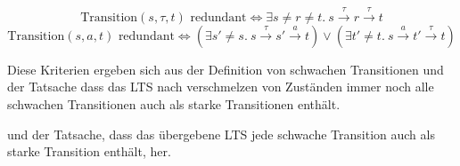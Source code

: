 \documentclass[a4paper]{scrartcl}
\begin{document}
\begin{equation*}
\text{Transition}(s, \tau, t) \text{ redundant} \Leftrightarrow \exists s \neq r \neq t.\: s \overset{\tau}{\rightarrow} r \overset{\tau}{\rightarrow} t
\end{equation*}
\begin{equation*}
\text{Transition}(s, a, t) \text{ redundant} \Leftrightarrow
(\exists s' \neq s.\: s \overset{\tau}{\rightarrow} s' \overset{a}{\rightarrow} t)
\vee (\exists t' \neq t.\: s \overset{a}{\rightarrow} t' \overset{\tau}{\rightarrow} t)
\end{equation*}

Diese Kriterien ergeben sich aus der Definition von schwachen Transitionen und der Tatsache dass das LTS nach verschmelzen von Zuständen immer noch alle schwachen Transitionen auch als starke Transitionen enthält.

und der Tatsache, dass das übergebene LTS jede schwache Transition auch als starke Transition enthält, her.
\end{document}
